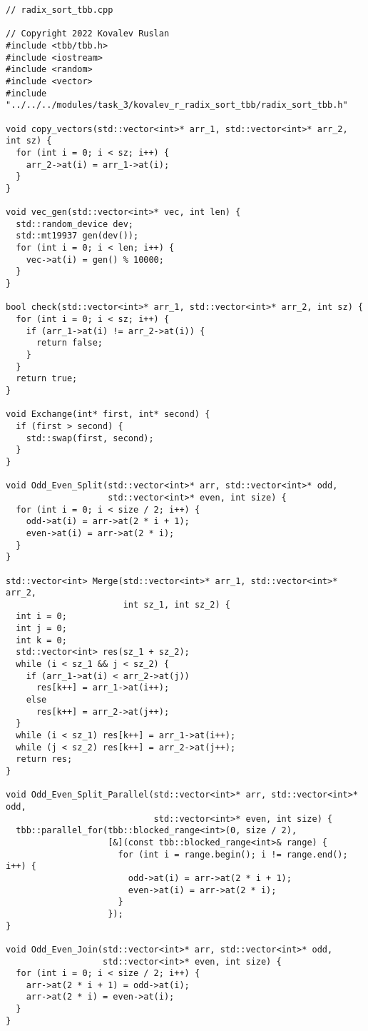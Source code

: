 \documentclass{report}
\begin{document}
\begin{lstlisting}
// radix_sort_tbb.cpp

// Copyright 2022 Kovalev Ruslan
#include <tbb/tbb.h>
#include <iostream>
#include <random>
#include <vector>
#include "../../../modules/task_3/kovalev_r_radix_sort_tbb/radix_sort_tbb.h"

void copy_vectors(std::vector<int>* arr_1, std::vector<int>* arr_2, int sz) {
  for (int i = 0; i < sz; i++) {
    arr_2->at(i) = arr_1->at(i);
  }
}

void vec_gen(std::vector<int>* vec, int len) {
  std::random_device dev;
  std::mt19937 gen(dev());
  for (int i = 0; i < len; i++) {
    vec->at(i) = gen() % 10000;
  }
}

bool check(std::vector<int>* arr_1, std::vector<int>* arr_2, int sz) {
  for (int i = 0; i < sz; i++) {
    if (arr_1->at(i) != arr_2->at(i)) {
      return false;
    }
  }
  return true;
}

void Exchange(int* first, int* second) {
  if (first > second) {
    std::swap(first, second);
  }
}

void Odd_Even_Split(std::vector<int>* arr, std::vector<int>* odd,
                    std::vector<int>* even, int size) {
  for (int i = 0; i < size / 2; i++) {
    odd->at(i) = arr->at(2 * i + 1);
    even->at(i) = arr->at(2 * i);
  }
}

std::vector<int> Merge(std::vector<int>* arr_1, std::vector<int>* arr_2,
                       int sz_1, int sz_2) {
  int i = 0;
  int j = 0;
  int k = 0;
  std::vector<int> res(sz_1 + sz_2);
  while (i < sz_1 && j < sz_2) {
    if (arr_1->at(i) < arr_2->at(j))
      res[k++] = arr_1->at(i++);
    else
      res[k++] = arr_2->at(j++);
  }
  while (i < sz_1) res[k++] = arr_1->at(i++);
  while (j < sz_2) res[k++] = arr_2->at(j++);
  return res;
}

void Odd_Even_Split_Parallel(std::vector<int>* arr, std::vector<int>* odd,
                             std::vector<int>* even, int size) {
  tbb::parallel_for(tbb::blocked_range<int>(0, size / 2),
                    [&](const tbb::blocked_range<int>& range) {
                      for (int i = range.begin(); i != range.end(); i++) {
                        odd->at(i) = arr->at(2 * i + 1);
                        even->at(i) = arr->at(2 * i);
                      }
                    });
}

void Odd_Even_Join(std::vector<int>* arr, std::vector<int>* odd,
                   std::vector<int>* even, int size) {
  for (int i = 0; i < size / 2; i++) {
    arr->at(2 * i + 1) = odd->at(i);
    arr->at(2 * i) = even->at(i);
  }
}


\end{lstlisting}
\end{document}
